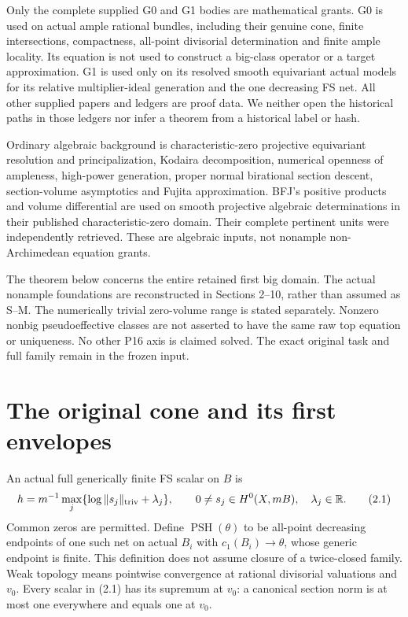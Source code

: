 \documentclass[10pt]{article}
\newcommand{\PSH}{\operatorname{PSH}}
\begin{document}
Only the complete supplied G0 and G1 bodies are mathematical grants.
G0 is used on actual ample rational bundles, including their genuine cone,
finite intersections, compactness, all-point divisorial determination and
finite ample locality. Its equation is not used to construct a big-class
operator or a target approximation. G1 is used only on its resolved smooth
equivariant actual models for its relative multiplier-ideal generation and
the one decreasing FS net. All other supplied papers and ledgers are proof
data. We neither open the historical paths in those ledgers nor infer a
theorem from a historical label or hash.

Ordinary algebraic background is characteristic-zero projective equivariant
resolution and principalization, Kodaira decomposition, numerical openness
of ampleness, high-power generation, proper normal birational section
descent, section-volume asymptotics and Fujita approximation. BFJ's
positive products and volume differential are used on smooth projective
algebraic determinations in their published characteristic-zero domain.
Their complete pertinent units were independently retrieved. These are
algebraic inputs, not nonample non-Archimedean equation grants.

The theorem below concerns the entire retained first big domain.
The actual nonample foundations are reconstructed in Sections 2--10,
rather than assumed as S--M. The numerically trivial zero-volume
range is stated separately. Nonzero nonbig pseudoeffective classes
are not asserted to have the same raw top equation or uniqueness.
No other P16 axis is claimed solved. The exact original task and full
family remain in the frozen input.

\section{The original cone and its first envelopes}
An actual full generically finite FS scalar on $B$ is
\[
 h=m^{-1}\max_j\{\log\|s_j\|_{\rm triv}+\lambda_j\},
 \qquad 0\ne s_j\in H^0(X,mB),\quad\lambda_j\in\mathbb R.
 \tag{2.1}
\]
Common zeros are permitted. Define $\PSH(\theta)$ to be all-point
decreasing endpoints of one such net on actual $B_i$ with
$c_1(B_i)\to\theta$, whose generic endpoint is finite. This definition
does not assume closure of a twice-closed family. Weak topology means
pointwise convergence at rational divisorial valuations and $v_0$.
Every scalar in (2.1) has its supremum at $v_0$: a canonical section norm
is at most one everywhere and equals one at $v_0$.
\end{document}
